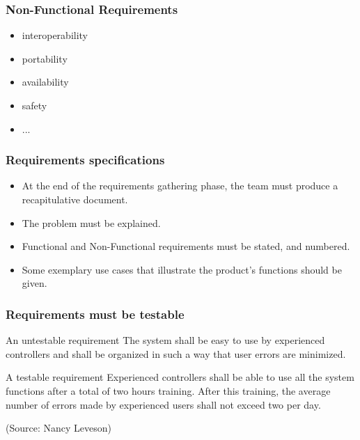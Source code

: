 \documentclass[10pt]{beamer}
\begin{document}
\begin{frame}[fragile]
  \frametitle{Non-Functional Requirements}
  \begin{itemize}
  \item interoperability
  \item portability
  \item availability
  \item safety
  \item ...
  \end{itemize}
\end{frame}

\begin{frame}[fragile]
\frametitle{Requirements specifications}
\begin{itemize}
\item At the end of the requirements gathering phase, the team must produce a
  recapitulative document.
\item The problem must be explained.
\item Functional and Non-Functional requirements must be stated, and numbered.
\item Some exemplary use cases that illustrate the product's functions should be
  given.
\end{itemize}
\end{frame}

\begin{frame}[fragile]
  \frametitle{Requirements must be testable}
  \begin{alertblock}{An untestable requirement}
    The system shall be easy to use by experienced
    controllers and shall be organized in such a way
    that user errors are minimized.
  \end{alertblock}
  \begin{exampleblock}{A testable requirement}
    Experienced controllers shall be able to use all
    the system functions after a total of two hours
    training. After this training, the average number
    of errors made by experienced users shall not
    exceed two per day.
  \end{exampleblock}
  \tiny (Source: Nancy Leveson)
\end{frame}
\end{document}
